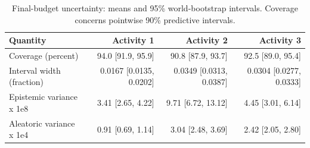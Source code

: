\begin{table}[H]
\centering
\caption{Final-budget uncertainty: means and 95\% world-bootstrap intervals. Coverage concerns pointwise 90\% predictive intervals.}
\label{tab:uncertainty}
\scriptsize
\setlength{\tabcolsep}{3pt}
\begin{tabular}{lrrr}
\toprule
Quantity & Activity 1 & Activity 2 & Activity 3 \\
\midrule
Coverage (percent) & 94.0 [91.9, 95.9] & 90.8 [87.9, 93.7] & 92.5 [89.0, 95.4] \\
Interval width (fraction) & 0.0167 [0.0135, 0.0202] & 0.0349 [0.0313, 0.0387] & 0.0304 [0.0277, 0.0333] \\
Epistemic variance x 1e8 & 3.41 [2.65, 4.22] & 9.71 [6.72, 13.12] & 4.45 [3.01, 6.14] \\
Aleatoric variance x 1e4 & 0.91 [0.69, 1.14] & 3.04 [2.48, 3.69] & 2.42 [2.05, 2.80] \\
\bottomrule
\end{tabular}
\end{table}
